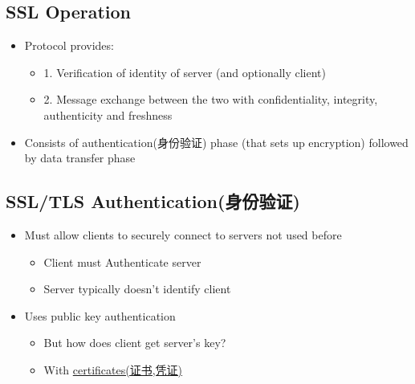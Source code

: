 \documentclass[12pt]{ctexart}   %
\begin{document}
	\subsection{SSL Operation}
	\begin{itemize}
		\item Protocol provides:
		\begin{itemize}
			\item {\color{blue} 1.} Verification of identity of server (and optionally client)
			\item {\color{blue} 2.} Message exchange between the two with confidentiality, integrity, authenticity and freshness
		\end{itemize}

		\item Consists of authentication(身份验证) phase (that sets up encryption) followed by data transfer phase
	\end{itemize}

	\subsection{SSL/TLS Authentication(身份验证)}
	\begin{itemize}
		\item Must allow clients to securely connect to servers not used before
		\begin{itemize}
			\item Client must Authenticate server
			\item Server typically doesn't identify client
		\end{itemize}

		\item Uses public key authentication
		\begin{itemize}
			\item But how does client get server's key?
			\item With \underline{certificates(证书,凭证)}
		\end{itemize}
	\end{itemize}
\end{document}
